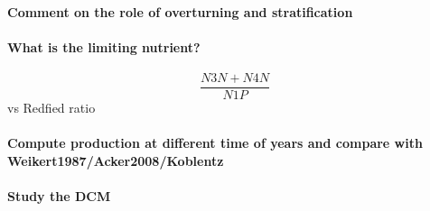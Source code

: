 \paragraph{Comment on the role of overturning and stratification}

\paragraph{What is the limiting nutrient?}

$$\frac{N3N + N4N}{N1P}$$
vs Redfied ratio

\paragraph{Compute production at different time of years and compare
with Weikert1987/Acker2008/Koblentz}

\paragraph{Study the DCM}
